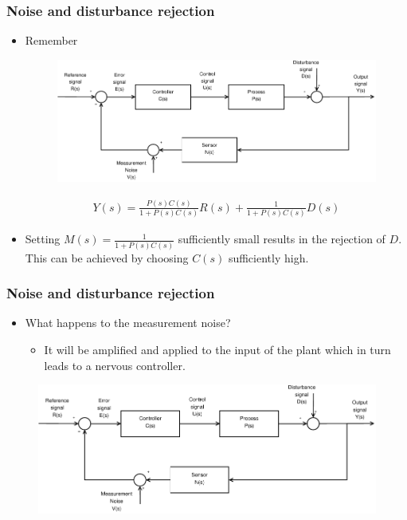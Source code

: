 \begin{frame}
	\frametitle{Noise and disturbance rejection}
	\begin{block}{}
		\begin{itemize}
			\item Remember
			\vspace{-1em}
			\begin{figure}
				\centering
				\includegraphics[width=0.9\linewidth]{Closed-Loop-measure}
				\label{fig:Closed-Loop4}
			\end{figure}
			\vspace{-1.5em}
			\begin{align*}
				Y(s) = \frac{P(s)C(s)}{1+P(s)C(s)}R(s) + \frac{1}{1+P(s)C(s)}D(s)
			\end{align*}
			\item Setting $M(s)=\frac{1}{1+P(s)C(s)}$ sufficiently small results in the rejection of $D$. This can be achieved by choosing $C(s)$ sufficiently high.
		\end{itemize}	
	\end{block}
\end{frame}


\begin{frame}
	\frametitle{Noise and disturbance rejection}
	\begin{block}{}
		\begin{itemize}
			\item What happens to the measurement noise?
			\begin{itemize}
				\item It will be amplified and applied to the input of the plant which in turn leads to a nervous controller.
			\end{itemize}
		\end{itemize}
		\begin{figure}
			\centering
			\includegraphics[width=0.8\linewidth]{Closed-Loop-measure}
			\label{fig:Closed-Loop5}
		\end{figure}
	\end{block}
\end{frame}


